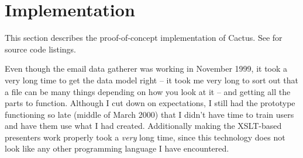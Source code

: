 





\chapter{Implementation}

\label{cha:cactus-implementation}






This section describes the proof-of-concept implementation of Cactus.
See  for source code listings.

Even though the email data gatherer was working in November 1999, it
took a very long time to get the data model right -- it took me very
long to sort out that a file can be many things depending on how you
look at it --  and getting all the
parts to function.  Although I cut down on expectations, I still had
the prototype functioning so late (middle of March 2000) that I didn't have
time to train users and have them use what I had created.
Additionally making the XSLT-based presenters work properly took a
\textit{very} long time, since this technology does not look like any
other programming language I have encountered.

